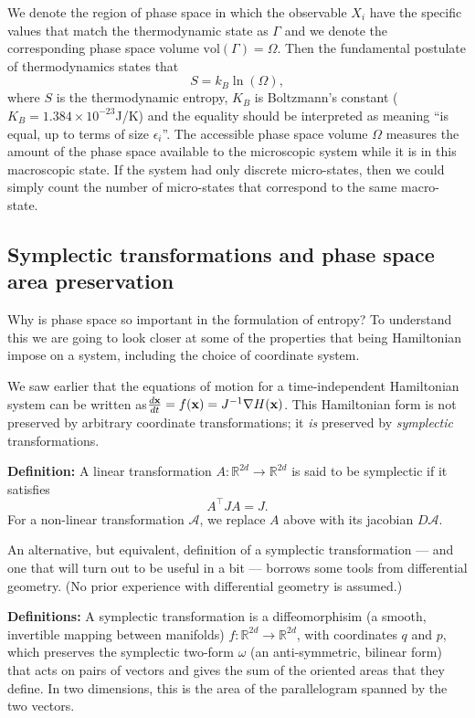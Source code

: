 We denote the region of phase space in which the observable $X_i$ have the specific values that match the thermodynamic state as $\Gamma$ and we denote the corresponding phase space volume $\text{vol}(\Gamma)=\Omega$. Then the fundamental postulate of thermodynamics states that
\begin{equation}
	S = k_B\ln(\Omega),
	\label{eqS}
\end{equation}
where $S$ is the thermodynamic entropy, $K_B$ is Boltzmann's constant ($K_B = 1.384\times10^{-23}$J/K) and the equality should be interpreted as meaning ``is equal, up to terms of size $\epsilon_i$''. The accessible phase space volume $\Omega$ measures the amount of the phase space available to the microscopic system while it is in this macroscopic state. If the system had only discrete micro-states, then we could simply count the number of micro-states that correspond to the same macro-state. 


\subsection{Symplectic transformations and phase space area preservation}
Why is phase space so important in the formulation of entropy? To understand this we are going to look closer at some of the properties that being Hamiltonian impose on a system, including the choice of coordinate system.

We saw earlier that the equations of motion for a time-independent Hamiltonian system can be written as$ \frac{d{\bf x}}{dt} = f({\bf x}) = J^{-1}\nabla H({\bf x})$. This Hamiltonian form is not preserved by arbitrary coordinate transformations; it \emph{is} preserved by \emph{symplectic} transformations.

{\bf Definition:} A linear transformation $A: \mathbb{R}^{2d}\rightarrow\mathbb{R}^{2d}$ is said to be symplectic if it satisfies
$$ A^\top J A = J.$$
For a non-linear transformation $\mathcal{A}$, we replace $A$ above with its jacobian $D\mathcal{A}$.

An alternative, but equivalent, definition of a symplectic transformation --- and one that will turn out to be useful in a bit --- borrows some tools from differential geometry. (No prior experience with differential geometry is assumed.)

{\bf Definitions:} A symplectic transformation is a diffeomorphisim (a smooth, invertible mapping between manifolds) $f:\mathbb{R}^{2d}\rightarrow\mathbb{R}^{2d}$, with coordinates $q$ and $p$, which preserves the symplectic two-form $\omega$ (an anti-symmetric, bilinear form) that acts on pairs of vectors and gives the sum of the oriented areas that they define. In two dimensions, this is the area of the parallelogram spanned by the two vectors.

